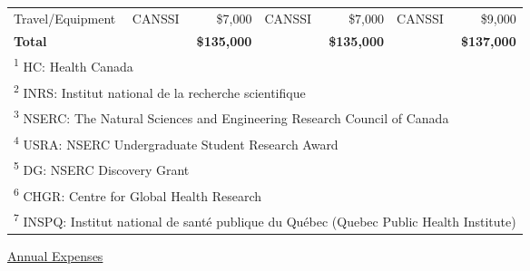 \documentclass[12pt,letterpaper]{article}
\begin{document}
\begin{longtable}{|>{}l|>{}l>{}r|l>{}r|l>{}r|}
\cmidrule{1-7}\pagebreak[0]
Travel/Equipment & CANSSI & \$7,000 & CANSSI & \$7,000 & CANSSI & \$9,000\\
\cmidrule{1-7}\pagebreak[0]
\textbf{Total} &  & \textbf{\$135,000} &  & \textbf{\$135,000} &  & \textbf{\$137,000}\\
\bottomrule
\multicolumn{7}{l}{\rule{0pt}{1em}\textsuperscript{1} HC: Health Canada}\\
\multicolumn{7}{l}{\rule{0pt}{1em}\textsuperscript{2} INRS: Institut national de la recherche scientifique}\\
\multicolumn{7}{l}{\rule{0pt}{1em}\textsuperscript{3} NSERC: The Natural Sciences and Engineering Research Council of Canada}\\
\multicolumn{7}{l}{\rule{0pt}{1em}\textsuperscript{4} USRA: NSERC Undergraduate Student Research Award}\\
\multicolumn{7}{l}{\rule{0pt}{1em}\textsuperscript{5} DG: NSERC Discovery Grant}\\
\multicolumn{7}{l}{\rule{0pt}{1em}\textsuperscript{6} CHGR: Centre for Global Health Research}\\
\multicolumn{7}{l}{\rule{0pt}{1em}\textsuperscript{7} INSPQ: Institut national de santé publique du Québec (Quebec Public Health Institute)}\\
\end{longtable}

\vspace{-1em}
\underline{Annual Expenses}
\end{document}
